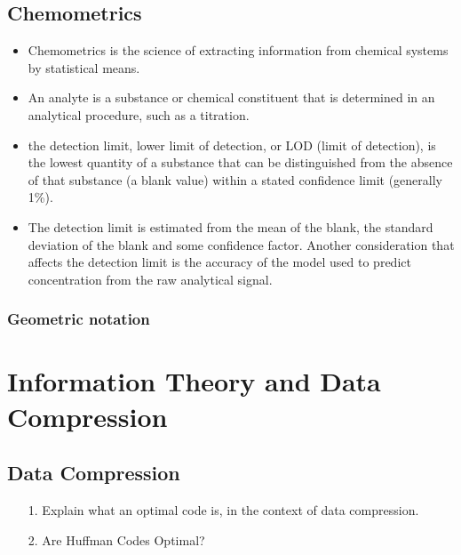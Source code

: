 \section{Chemometrics}
\begin{itemize}
	\item  Chemometrics is the science of extracting information from chemical systems by statistical means.
	\item An analyte is a substance or chemical constituent that is determined in an analytical procedure, such as a titration.
	\item the detection limit, lower limit of detection, or LOD (limit of detection), is the lowest quantity of a substance that can be distinguished from the absence of that substance (a blank value) within a stated confidence limit (generally 1\%).
	\item The detection limit is estimated from the mean of the blank, the standard deviation of the blank and some confidence factor. Another consideration that affects the detection limit is the accuracy of the model used to predict concentration from the raw analytical signal.
	
\end{itemize}

\subsection{Geometric notation}

\chapter{ Information Theory and Data Compression}

\section{Data Compression}
\begin{itemize}
	\item[1.] Explain what an optimal code is, in the context of data compression.
	\item[2.] Are Huffman Codes Optimal?
\end{itemize}


